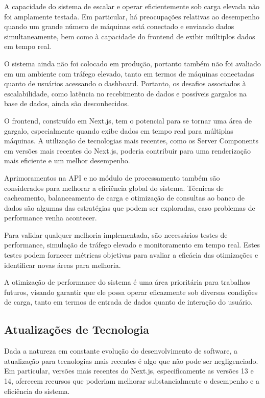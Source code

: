 A capacidade do sistema de escalar e operar eficientemente sob carga elevada não foi amplamente testada. Em particular, há preocupações relativas ao desempenho quando um grande número de máquinas está conectado e enviando dados simultaneamente, bem como à capacidade do frontend de exibir múltiplos dados em tempo real.

O sistema ainda não foi colocado em produção, portanto também não foi avaliado em um ambiente com tráfego elevado, tanto em termos de máquinas conectadas quanto de usuários acessando o dashboard. Portanto, os desafios associados à escalabilidade, como latência no recebimento de dados e possíveis gargalos na base de dados, ainda são desconhecidos.

O frontend, construído em Next.js, tem o potencial para se tornar uma área de gargalo, especialmente quando exibe dados em tempo real para múltiplas máquinas. A utilização de tecnologias mais recentes, como os Server Components em versões mais recentes do Next.js, poderia contribuir para uma renderização mais eficiente e um melhor desempenho.

Aprimoramentos na API e no módulo de processamento também são considerados para melhorar a eficiência global do sistema. Técnicas de cacheamento, balanceamento de carga e otimização de consultas ao banco de dados são algumas das estratégias que podem ser exploradas, caso problemas de performance venha acontecer.

Para validar qualquer melhoria implementada, são necessários testes de performance, simulação de tráfego elevado e monitoramento em tempo real. Estes testes podem fornecer métricas objetivas para avaliar a eficácia das otimizações e identificar novas áreas para melhoria.

A otimização de performance do sistema é uma área prioritária para trabalhos futuros, visando garantir que ele possa operar eficazmente sob diversas condições de carga, tanto em termos de entrada de dados quanto de interação do usuário.

\subsection{Atualizações de Tecnologia}

Dada a natureza em constante evolução do desenvolvimento de software, a atualização para tecnologias mais recentes é algo que não pode ser negligenciado. Em particular, versões mais recentes do Next.js, especificamente as versões 13 e 14, oferecem recursos que poderiam melhorar substancialmente o desempenho e a eficiência do sistema.

